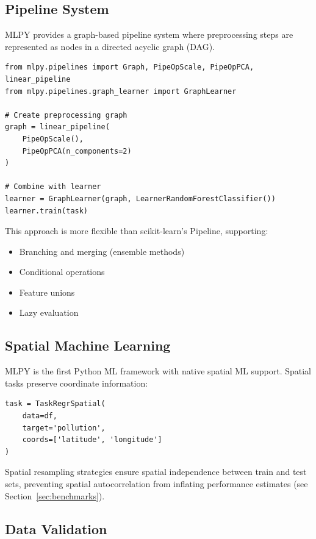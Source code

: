 \documentclass[twoside,11pt]{article}
\begin{document}
\subsection{Pipeline System}

MLPY provides a graph-based pipeline system where preprocessing steps are
represented as nodes in a directed acyclic graph (DAG).

\begin{lstlisting}
from mlpy.pipelines import Graph, PipeOpScale, PipeOpPCA, linear_pipeline
from mlpy.pipelines.graph_learner import GraphLearner

# Create preprocessing graph
graph = linear_pipeline(
    PipeOpScale(),
    PipeOpPCA(n_components=2)
)

# Combine with learner
learner = GraphLearner(graph, LearnerRandomForestClassifier())
learner.train(task)
\end{lstlisting}

This approach is more flexible than scikit-learn's Pipeline, supporting:
\begin{itemize}
  \item Branching and merging (ensemble methods)
  \item Conditional operations
  \item Feature unions
  \item Lazy evaluation
\end{itemize}

\subsection{Spatial Machine Learning}

MLPY is the first Python ML framework with native spatial ML support. Spatial
tasks preserve coordinate information:

\begin{lstlisting}
task = TaskRegrSpatial(
    data=df,
    target='pollution',
    coords=['latitude', 'longitude']
)
\end{lstlisting}

Spatial resampling strategies ensure spatial independence between train and
test sets, preventing spatial autocorrelation from inflating performance
estimates (see Section~\ref{sec:benchmarks}).

\subsection{Data Validation}
\end{document}
